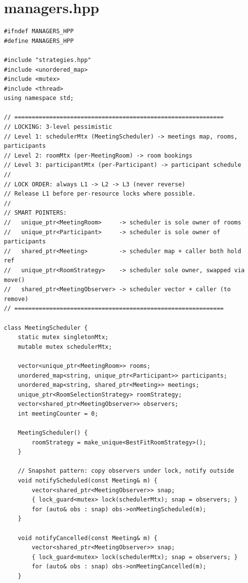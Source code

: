 \documentclass[11pt,a4paper]{article}
\begin{document}
\section{managers.hpp}
\begin{lstlisting}[title={\texttt{managers.hpp}}]
#ifndef MANAGERS_HPP
#define MANAGERS_HPP

#include "strategies.hpp"
#include <unordered_map>
#include <mutex>
#include <thread>
using namespace std;

// ============================================================
// LOCKING: 3-level pessimistic
// Level 1: schedulerMtx (MeetingScheduler) -> meetings map, rooms, participants
// Level 2: roomMtx (per-MeetingRoom) -> room bookings
// Level 3: participantMtx (per-Participant) -> participant schedule
//
// LOCK ORDER: always L1 -> L2 -> L3 (never reverse)
// Release L1 before per-resource locks where possible.
//
// SMART POINTERS:
//   unique_ptr<MeetingRoom>     -> scheduler is sole owner of rooms
//   unique_ptr<Participant>     -> scheduler is sole owner of participants
//   shared_ptr<Meeting>         -> scheduler map + caller both hold ref
//   unique_ptr<RoomStrategy>    -> scheduler sole owner, swapped via move()
//   shared_ptr<MeetingObserver> -> scheduler vector + caller (to remove)
// ============================================================

class MeetingScheduler {
    static mutex singletonMtx;
    mutable mutex schedulerMtx;

    vector<unique_ptr<MeetingRoom>> rooms;
    unordered_map<string, unique_ptr<Participant>> participants;
    unordered_map<string, shared_ptr<Meeting>> meetings;
    unique_ptr<RoomSelectionStrategy> roomStrategy;
    vector<shared_ptr<MeetingObserver>> observers;
    int meetingCounter = 0;

    MeetingScheduler() {
        roomStrategy = make_unique<BestFitRoomStrategy>();
    }

    // Snapshot pattern: copy observers under lock, notify outside
    void notifyScheduled(const Meeting& m) {
        vector<shared_ptr<MeetingObserver>> snap;
        { lock_guard<mutex> lock(schedulerMtx); snap = observers; }
        for (auto& obs : snap) obs->onMeetingScheduled(m);
    }

    void notifyCancelled(const Meeting& m) {
        vector<shared_ptr<MeetingObserver>> snap;
        { lock_guard<mutex> lock(schedulerMtx); snap = observers; }
        for (auto& obs : snap) obs->onMeetingCancelled(m);
    }


\end{lstlisting}
\end{document}
